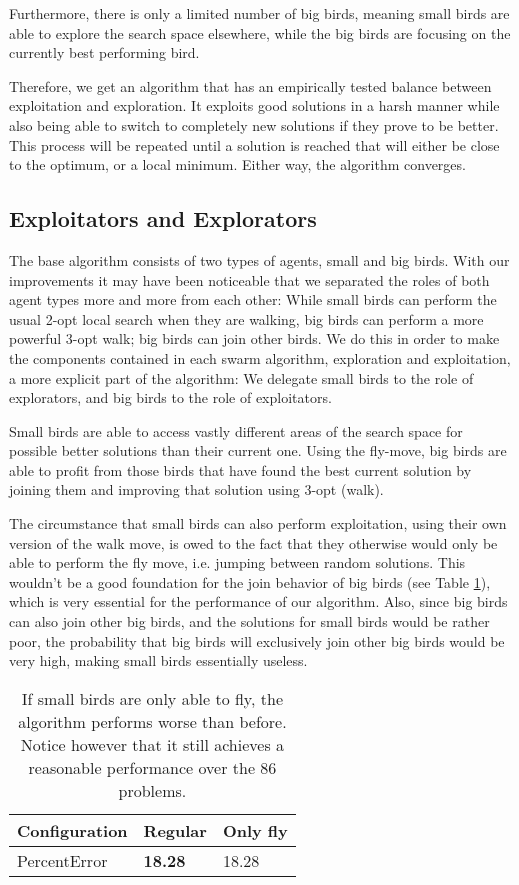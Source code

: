 Furthermore, there is only a limited number of big birds, meaning small birds are able
to explore the search space elsewhere, while the big birds are focusing on the currently best performing bird.

Therefore, we get an algorithm that has an empirically tested balance between exploitation and exploration.
It exploits good solutions in a harsh manner while also being able to switch to completely new solutions if they prove to be better.
This process will be repeated until a solution is reached that will either be close to the optimum, or a local minimum.
Either way, the algorithm converges.

\subsection{Exploitators and Explorators}
The base algorithm consists of two types of agents, small and big birds.
With our improvements it may have been noticeable that we separated the roles
of both agent types more and more from each other:
While small birds can perform the usual 2-opt local search when they are walking,
big birds can perform a more powerful 3-opt walk;
big birds can join other birds.
We do this in order to make the components contained in each swarm algorithm,
exploration and exploitation, a more explicit part of the algorithm:
We delegate small birds to the role of explorators, and big birds to the role of exploitators.

Small birds are able to access vastly different areas of the search space for possible better
solutions than their current one. Using the fly-move, big birds are able to profit
from those birds that have found the best current solution by joining them and
improving that solution using 3-opt (walk).


The circumstance that small birds can also perform exploitation, using their own version of the walk move,
is owed to the fact that they otherwise would only be able to perform
the fly move, i.e. jumping between random solutions.
This wouldn’t be a good foundation for the join behavior of big birds (see Table \ref{small_birds_only_fly}),
which is very essential for the performance of our algorithm.
Also, since big birds can also join other big birds,
and the solutions for small birds would be rather poor, the probability that
big birds will exclusively join other big birds would be very high,
making small birds essentially useless.

\begin{table}[h!]
\centering
\begin{tabular}{ |p{2.5cm}||p{0.75cm}|p{0.75cm}|  }
 \hline
 Configuration& Regular & Only fly\\
 \hline \hline
PercentError & \textbf{18.28} & 18.28\\
\hline
\end{tabular}
\caption{If small birds are only able to fly, the algorithm performs worse than before. Notice however that it still achieves a reasonable performance over the 86 problems.}
\label{small_birds_only_fly}
\end{table}

